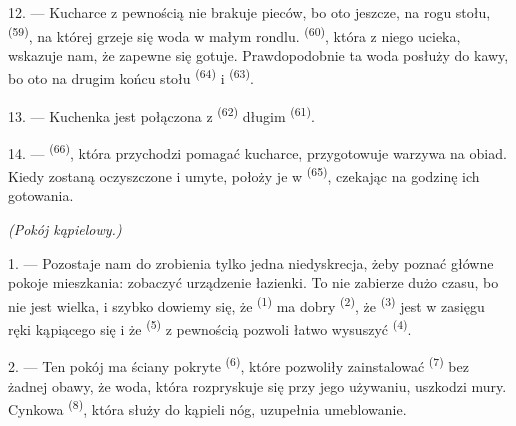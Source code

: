 12. --- Kucharce z pewnością nie brakuje pieców, bo oto jeszcze, na rogu stołu,
 \textsuperscript{(59)}, na której grzeje się woda w małym
rondlu.  \textsuperscript{(60)}, która z niego ucieka, wskazuje nam, że
zapewne się gotuje. Prawdopodobnie ta woda posłuży do kawy, bo oto na drugim końcu
stołu  \textsuperscript{(64)} i 
\textsuperscript{(63)}.

13. --- Kuchenka jest połączona z  \textsuperscript{(62)}
długim  \textsuperscript{(61)}.

14. ---  \textsuperscript{(66)}, która przychodzi pomagać kucharce,
przygotowuje warzywa na obiad. Kiedy zostaną oczyszczone i umyte, położy je w
 \textsuperscript{(65)}, czekając na godzinę ich gotowania.

\VUsaut{4.0mm}
{\centering\fontsize{10.2pt}{10.2pt}\selectfont{}
 \textit{(Pokój kąpielowy.)}\par}
\VUsaut{3.0mm}

1. --- Pozostaje nam do zrobienia tylko jedna niedyskrecja, żeby poznać główne pokoje
mieszkania: zobaczyć urządzenie łazienki. To nie zabierze dużo czasu, bo nie jest
wielka, i szybko dowiemy się, że  \textsuperscript{(1)} ma dobry
 \textsuperscript{(2)}, że 
\textsuperscript{(3)} jest w zasięgu ręki kąpiącego się i że  \textsuperscript{(5)} z pewnością pozwoli łatwo wysuszyć 
\textsuperscript{(4)}.

2. --- Ten pokój ma ściany pokryte  \textsuperscript{(6)}, które
pozwoliły zainstalować  \textsuperscript{(7)} bez żadnej obawy, że
woda, która rozpryskuje się przy jego używaniu, uszkodzi mury. Cynkowa 
\textsuperscript{(8)}, która służy do kąpieli nóg, uzupełnia umeblowanie.
\VUsaut{6.0mm}
\VUfilet{22mm}
